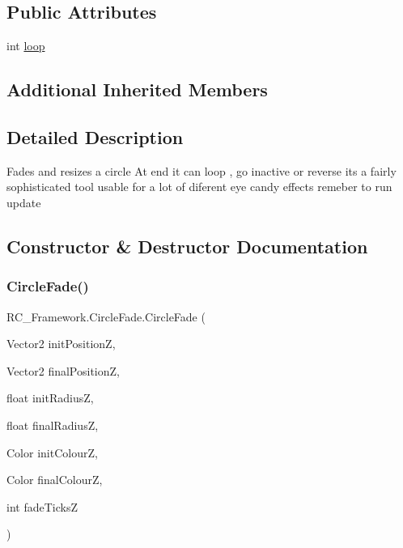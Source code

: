 \subsection*{Public Attributes}
\begin{DoxyCompactItemize}
\item 
int \mbox{\hyperlink{class_r_c___framework_1_1_circle_fade_a3a0b913d580633476d9d6c78a5054c69}{loop}}
\end{DoxyCompactItemize}
\subsection*{Additional Inherited Members}


\subsection{Detailed Description}
Fades and resizes a circle At end it can loop , go inactive or reverse its a fairly sophisticated tool usable for a lot of diferent eye candy effects remeber to run update 



\subsection{Constructor \& Destructor Documentation}
\mbox{\label{class_r_c___framework_1_1_circle_fade_af5b020dad42c77795b9c92808f019dfe}} 
\subsubsection{\texorpdfstring{Circle\+Fade()}{CircleFade()}}
{\footnotesize\ttfamily R\+C\+\_\+\+Framework.\+Circle\+Fade.\+Circle\+Fade (\begin{DoxyParamCaption}\item[{Vector2}]{init\+PositionZ,  }\item[{Vector2}]{final\+PositionZ,  }\item[{float}]{init\+RadiusZ,  }\item[{float}]{final\+RadiusZ,  }\item[{Color}]{init\+ColourZ,  }\item[{Color}]{final\+ColourZ,  }\item[{int}]{fade\+TicksZ }\end{DoxyParamCaption})}



